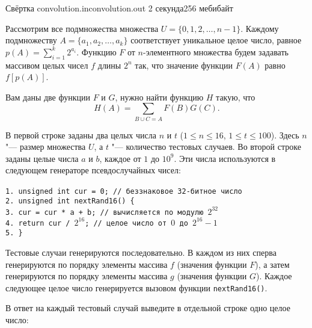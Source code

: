 
\begin{problem}{Свёртка}
{convolution.in}{convolution.out}
{2 секунда}{256 мебибайт}{}

\gdef\LIMIT{16}

Рассмотрим все подмножества множества $U = \{0, 1, 2, \dots, n-1\}$.
Каждому подмножеству $A = \{a_1, a_2, \dots, a_k\}$ соответствует
уникальное целое число, равное $p(A) = \sum\limits_{i=1}^k 2^{a_i}$.
Функцию $F$ от $n$-элементного множества будем задавать массивом целых чисел
$f$ длины $2^n$ так, что значение функции $F(A)$ равно $f[p(A)]$.

Вам даны две функции $F$ и $G$, нужно найти функцию $H$ такую, что
$$H(A) = \sum\limits_{B \cup C = A}F(B)G(C)\text{.}$$

\InputFile

В первой строке заданы два целых числа $n$ и $t$
($1 \le n \le \LIMIT$, $1 \le t \le 100$).
Здесь $n$ "--- размер множества $U$, а $t$ "--- количество тестовых случаев.
Во второй строке заданы целые числа $a$ и $b$, каждое от $1$ до $10^9$.
Эти числа используются в следующем генераторе псевдослучайных чисел: \\
\texttt{
~ \\
1.\hspace{0em} unsigned int cur = 0; // беззнаковое 32-битное число \\
2.\hspace{0em} unsigned int nextRand16() \{ \\
3.\hspace{2em}   cur = cur * a + b; // вычисляется по модулю $2^{32}$ \\
4.\hspace{2em}   return cur / $2^{16}$; // целое число от $0$ до $2^{16}-1$ \\
5.\hspace{0em} \} \\
}

Тестовые случаи генерируются последовательно.
В каждом из них
сперва генерируются по порядку элементы массива $f$ (значения функции $F$),
а затем генерируются по порядку элементы массива $g$ (значения функции $G$).
Каждое следующее целое число генерируется вызовом функции
\texttt{nextRand16()}.

\OutputFile

В ответ на каждый тестовый случай выведите в отдельной строке
одно целое число:


\end{problem}
